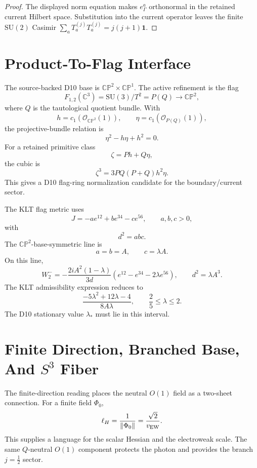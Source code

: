 \documentclass[11pt]{article}
\theoremstyle{definition}
\theoremstyle{remark}
\newcommand{\SU}{\mathrm{SU}}
\newcommand{\CP}{\mathbb{CP}}
\newcommand{\C}{\mathbb{C}}
\newcommand{\half}{\tfrac12}
\newcommand{\cO}{\mathcal O}
\begin{document}
\begin{proof}
The displayed norm equation makes \(e_\Gamma^a\) orthonormal in the retained
current Hilbert space.  Substitution into the current operator leaves the
finite \(\SU(2)\) Casimir \(\sum_aT_a^{(j)}T_a^{(j)}=j(j+1)\bm1\).
\end{proof}


\section{Product-To-Flag Interface}

The source-backed D10 base is \(\CP^2\times\CP^1\).  The active refinement is
the flag
\[
  F_{1,2}(\C^3)=\SU(3)/T^2=P(Q)\longrightarrow\CP^2,
\]
where \(Q\) is the tautological quotient bundle.  With
\[
  h=c_1(\cO_{\CP^2}(1)),
  \qquad
  \eta=c_1(\cO_{P(Q)}(1)),
\]
the projective-bundle relation is
\[
  \eta^2-h\eta+h^2=0.
\]
For a retained primitive class
\[
  \zeta=P h+Q\eta,
\]
the cubic is
\[
  \zeta^3=3PQ(P+Q)h^2\eta.
\]
This gives a D10 flag-ring normalization candidate for the boundary/current
sector.

The KLT flag metric uses
\[
  J=-ae^{12}+be^{34}-ce^{56},
  \qquad a,b,c>0,
\]
with
\[
  d^2=abc.
\]
The \(\CP^2\)-base-symmetric line is
\[
  a=b=A,\qquad c=\lambda A.
\]
On this line,
\[
  W_2^-
  =
  -\frac{2iA^2(1-\lambda)}{3d}
  \left(e^{12}-e^{34}-2\lambda e^{56}\right),
  \qquad d^2=\lambda A^3.
\]
The KLT admissibility expression reduces to
\[
  \frac{-5\lambda^2+12\lambda-4}{8A\lambda},
  \qquad
  \frac25\leq\lambda\leq2.
\]
The D10 stationary value \(\lambda_*\) must lie in this interval.


\section{\texorpdfstring{Finite Direction, Branched Base, And \(S^3\) Fiber}{Finite Direction, Branched Base, And S3 Fiber}}

The finite-direction reading places the neutral \(O(1)\) field as a
two-sheet connection.  For a finite field \(\Phi_0\),
\[
  \ell_H=\frac{1}{\|\Phi_0\|}=\frac{\sqrt2}{v_{\rm EW}}.
\]
This supplies a language for the scalar Hessian and the electroweak scale.
The same \(Q\)-neutral \(O(1)\) component protects the photon and provides the
branch \(j=\half\) sector.
\end{document}
